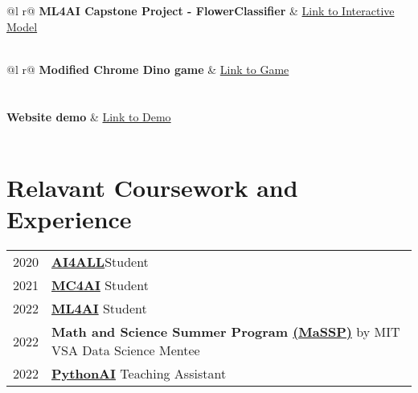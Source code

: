 \documentclass[a4paper,12pt]{article}
\begin{document}
\begin{tabularx}{\linewidth}{ @{}l r@{} }
\textbf{ML4AI Capstone Project - FlowerClassifier} & \hfill \href{https://huggingface.co/spaces/qmjnh/flowerClassification_2}{Link to Interactive Model} \\[3.75pt]
\\

\end{tabularx}


\begin{tabularx}{\linewidth}{ @{}l r@{} }
\textbf{Modified Chrome Dino game} & \hfill \href{https://qmjnh.github.io/dinogame/}{Link to Game} \\[3.75pt]
  \\
\\
\textbf{Website demo} & \hfill \href{https://qmjnh.github.io/CL1_20-23/}{Link to Demo} \\[3.75pt]
  \\


\end{tabularx}


\section{Relavant Coursework and Experience}


\begin{tabularx}{\linewidth}{@{}l X@{}}	

2020 & \href{https://i.imgur.com/XUBYdUB.png}{\textbf{AI4ALL}}\hfill Student\\ 
2021 & \href{https://i.imgur.com/XUBYdUB.png}{\textbf{MC4AI}} \hfill Student\\ 
2022 & \href{https://i.imgur.com/XUBYdUB.png}{\textbf{ML4AI}} \hfill Student\\ 
2022  & \textbf{Math and Science Summer Program \href{hhttps://www.facebook.com/masspvn}{(MaSSP)}} by MIT VSA  \hfill Data Science Mentee\\ 
2022  &  \href{https://i.imgur.com/XUBYdUB.png}{\textbf{PythonAI}} \hfill Teaching Assistant\\

\end{tabularx}
\end{document}
